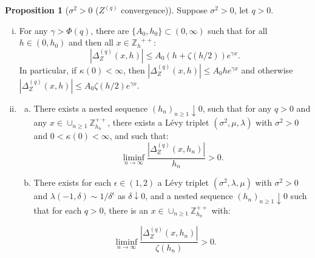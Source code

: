 \documentclass[pdftex,oneside,11pt,reqno]{amsart}
\theoremstyle{definition}
\theoremstyle{theorem}
\newtheorem{proposition}{Proposition}[section]
\theoremstyle{remark}
\numberwithin{equation}{section}
\numberwithin{definition}{section}
\begin{document}
\begin{proposition}[${\sigma^2}>0$ (${Z^{(q)}}$ convergence)]\label{proposition:Zqconvergence:non-trivial_diffusion}
Suppose ${\sigma^2}>0$, let $q>0$. 

\begin{enumerate}[(i)]
\item \label{diffusion>0:Zq:i} For any $\gamma>\Phi(q)$, there are $\{A_0,h_0\}\subset (0,\infty)$ such that for all $h\in (0,h_0)$ and then all $x\in {\mathbb{Z}_h}^{++}$: $$\left\vert{\Delta_{Z}^{(q)}(x,h)}\right\vert\leq A_0 \left(h+\zeta(h/2)\right) e^{\gamma x}.$$ In particular, if $\kappa(0)<\infty$, then $\left\vert{\Delta_{Z}^{(q)}(x,h)}\right\vert\leq A_0 he^{\gamma x}$ and otherwise $\left\vert{\Delta_{Z}^{(q)}(x,h)}\right\vert\leq A_0 \zeta(h/2)e^{\gamma x}$. 
\item \label{diffusion>0:Zq:ii}
\begin{enumerate}[(a)]
\item\label{Zqs:diffusion_postive:ii:a} There exists a nested sequence $(h_n)_{n\geq 1}\downarrow 0$, such that for any $q>0$ and any $x\in \cup_{n\geq 1}\mathbb{Z}_{h_n}^{++}$, there exists a L\'evy triplet $({\sigma^2},{\mu},{\lambda})$ with ${\sigma^2}>0$ and $0<\kappa(0)<\infty$, and such that:
$$\liminf_{n\to\infty}\frac{\left\vert{\Delta_{Z}^{(q)}(x,h_n)}\right\vert}{ h_n}>0.$$ 

\item\label{Zqs:diffusion_postive:ii:c}  There exists for each $\epsilon\in (1,2)$ a L\'evy triplet $({\sigma^2},{\lambda},{\mu})$ with ${\sigma^2}>0$ and $\lambda(-1,\delta)\sim 1/\delta^\epsilon$ as $\delta\downarrow 0$, and a nested sequence $(h_n)_{n\geq 1}\downarrow 0$ such that for each $q>0$, there is an $x\in \cup_{n\geq 1}\mathbb{Z}_{h_n}^{++}$ with:
\end{enumerate}
$$\liminf_{n\to\infty}\frac{\left\vert{\Delta_{Z}^{(q)}(x,h_n)}\right\vert}{\zeta(h_n)}>0.$$ 
\end{enumerate}
\end{proposition}
\end{document}
